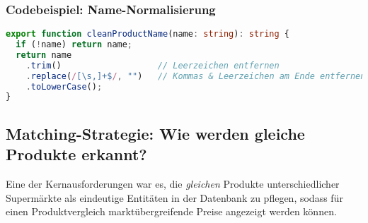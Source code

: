 \subsubsection{Codebeispiel: Name-Normalisierung}
\begin{lstlisting}[language=TypeScript, caption={Vereinheitlichung von Produktnamen}]
export function cleanProductName(name: string): string {
  if (!name) return name;
  return name
    .trim()                   // Leerzeichen entfernen
    .replace(/[\s,]+$/, "")   // Kommas & Leerzeichen am Ende entfernen
    .toLowerCase();
}
\end{lstlisting}

\subsection{Matching-Strategie: Wie werden gleiche Produkte erkannt?}

Eine der Kernausforderungen war es, die \emph{gleichen} Produkte unterschiedlicher Supermärkte als eindeutige Entitäten in der Datenbank zu pflegen, sodass für einen Produktvergleich marktübergreifende Preise angezeigt werden können.

